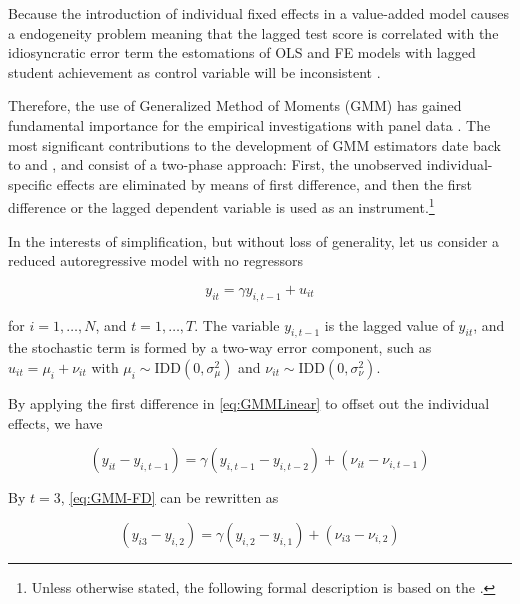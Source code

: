 \documentclass[a4paper, 12pt]{article}
\begin{document}
Because the introduction of individual fixed effects in a value-added model causes a endogeneity problem \textemdash meaning that the lagged test score is correlated with the idiosyncratic error term \textemdash the estomations of OLS and FE models with lagged student achievement as control variable will be inconsistent \citep[see e.g.][]{bond2002dynamic, nickell1981biases}. 

Therefore, the use of Generalized Method of Moments (GMM) has gained fundamental importance for the empirical investigations with panel data \citep[see e.g.][]{pesaran2015time,baltagi2008econometric}. The most significant contributions to the development of GMM estimators date back to \citet{hsiao1986analysis, arellano1989note, arellano1991some} and \citet{blundell1998initial}, and consist of a two-phase approach: First, the unobserved individual-specific effects are eliminated by means of first difference, and then the first difference or the lagged dependent variable is used as an instrument.\footnote{Unless otherwise stated, the following formal description is based on the \citet{baltagi2008econometric}.}

In the interests of simplification, but without loss of generality, let us consider a reduced autoregressive model with no regressors



\begin{equation} \label{eq:GMMLinear}
y_{it} = \gamma y_{i,t-1} + u_{it}
\end{equation}


for $i= 1, \dotsc, N$, and $t= 1, \dotsc, T$. The variable $y_{i,t-1}$ is the lagged value of $y_{it}$, and the stochastic term is formed by a two-way error component, such as $u_{it} =\mu_{i} + \nu_{it}$ with $\mu_{i} \sim \text{IDD}(0, \sigma^2_{\mu})$ and $\nu_{it} \sim \text{IDD}(0, \sigma^2_{\nu})$. 

By applying the first difference in \eqref{eq:GMMLinear} to offset out the individual effects, we have


\begin{equation} \label{eq:GMM-FD}
(y_{it} - y_{i,t-1}) = \gamma (y_{i,t-1} - y_{i,t-2}) + (\nu_{it} - \nu_{i,t-1})
\end{equation}

By $t=3$, \eqref{eq:GMM-FD} can be rewritten as


\begin{equation} \label{eq:GMM-FDt3}
(y_{i3} - y_{i,2}) = \gamma (y_{i,2} - y_{i,1}) + (\nu_{i3} - \nu_{i,2})
\end{equation}
\end{document}
